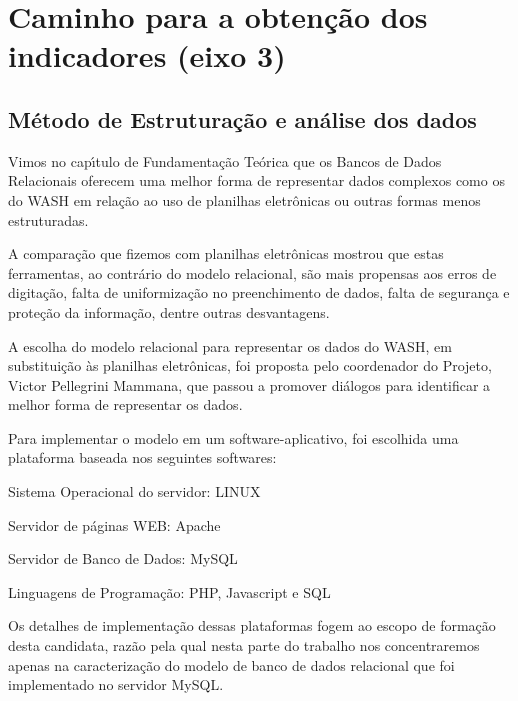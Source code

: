 \documentclass[
12pt,		%
openright,	%
twoside,  %
a4paper,			%
chapter=TITLE,		%
english,			%
french,				%
spanish,			%
brazil				%
]{USPSC-classe/USPSC}
\begin{document}
\section[Caminho para a obten\c{c}\~ao dos indicadores (eixo 3)]{Caminho para a obten\c{c}\~ao dos indicadores (eixo 3)}\label{Caminho para a obten\c{c}\~ao dos indicadores (eixo 3)}
\subsection[M\'etodo de Estrutura\c{c}\~ao e an\'alise dos dados]{M\'etodo de Estrutura\c{c}\~ao e an\'alise dos dados}\label{M\'etodo de Estrutura\c{c}\~ao e an\'alise dos dados}
Vimos no cap\'{\i}tulo de Fundamenta\c{c}\~ao Te\'orica que os Bancos de Dados Relacionais oferecem uma melhor forma de representar dados complexos como os do WASH em rela\c{c}\~ao ao uso de planilhas eletr\^onicas ou outras formas menos estruturadas.




A compara\c{c}\~ao que fizemos com planilhas eletr\^onicas mostrou que estas ferramentas, ao contr\'ario do modelo relacional, s\~ao mais propensas aos erros de digita\c{c}\~ao, falta de uniformiza\c{c}\~ao no preenchimento de dados, falta de seguran\c{c}a e prote\c{c}\~ao da informa\c{c}\~ao, dentre outras desvantagens.




A escolha do modelo relacional para representar os dados do WASH, em substitui\c{c}\~ao \`as planilhas eletr\^onicas, foi proposta pelo coordenador do Projeto, Victor Pellegrini Mammana, que passou a promover di\'alogos para identificar a melhor forma de representar os dados.




Para implementar o modelo em um software-aplicativo, foi escolhida uma plataforma baseada nos seguintes softwares:





\begin{alineas}
\item Sistema Operacional do servidor: LINUX
\item Servidor de p\'aginas WEB: Apache
\item Servidor de Banco de Dados: MySQL
\item Linguagens de Programa\c{c}\~ao: PHP, Javascript e SQL
\end{alineas}

Os detalhes de implementa\c{c}\~ao dessas plataformas fogem ao escopo de forma\c{c}\~ao desta candidata, raz\~ao pela qual nesta parte do trabalho nos concentraremos apenas na caracteriza\c{c}\~ao do modelo de banco de dados relacional que foi implementado no servidor MySQL.
\end{document}
